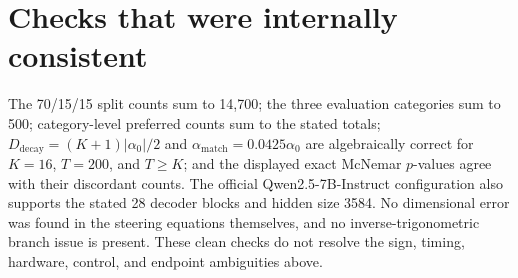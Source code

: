 \documentclass[11pt]{article}
\begin{document}
\section*{Checks that were internally consistent}

The 70/15/15 split counts sum to 14,700; the three evaluation categories sum to 500; category-level preferred counts sum to the stated totals; $D_{\text{decay}}=(K+1)|\alpha_0|/2$ and $\alpha_{\text{match}}=0.0425\alpha_0$ are algebraically correct for $K=16$, $T=200$, and $T\ge K$; and the displayed exact McNemar $p$-values agree with their discordant counts.  The official Qwen2.5-7B-Instruct configuration also supports the stated 28 decoder blocks and hidden size 3584.  No dimensional error was found in the steering equations themselves, and no inverse-trigonometric branch issue is present.  These clean checks do not resolve the sign, timing, hardware, control, and endpoint ambiguities above.
\end{document}
